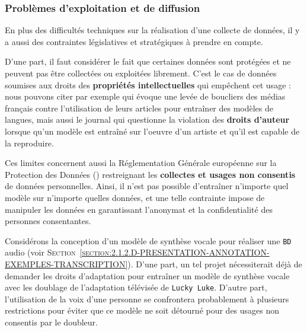 		
		
		\subsubsection{Problèmes d'exploitation et de diffusion}
		\label{section:2.3.1.C-DEFIS-ANNOTATION-ASPECT-DONNEES-DROITS}
		
			En plus des difficultés techniques sur la réalisation d'une collecte de données, il y a aussi des contraintes législatives et stratégiques à prendre en compte.
			
			D'une part, il faut considérer le fait que certaines données sont protégées et ne peuvent pas être collectées ou exploitées librement.
			C'est le cas de données soumises aux droits des \textbf{propriétés intellectuelles} qui empêchent cet usage : nous pouvons citer par exemple \cite{loignon:2023:ia-medias-francais} qui évoque une levée de boucliers des médias français contre l'utilisation de leurs articles pour entraîner des modèles de langues, mais aussi le journal \cite{les-echos:2023:ia-auteur-game} qui questionne la violation des \textbf{droits d'auteur} lorsque qu'un modèle est entraîné sur l'oeuvre d'un artiste et qu'il est capable de la reproduire.
			
			Ces limites concernent aussi la Réglementation Générale européenne sur la Protection des Données (\cite{european-commission:2016:regulation-eu-2016}) restreignant les \textbf{collectes et usages non consentis} de données personnelles.
			Ainsi, il n'est pas possible d'entraîner n'importe quel modèle sur n'importe quelles données, et une telle contrainte impose de manipuler les données en garantissant l'anonymat et la confidentialité des personnes consentantes.
			
			\begin{leftBarExamples}
				Considérons la conception d'un modèle de synthèse vocale pour réaliser une \texttt{BD} audio (voir \textsc{Section~\ref{section:2.1.2.D-PRESENTATION-ANNOTATION-EXEMPLES-TRANSCRIPTION}}).
				D'une part, un tel projet nécessiterait déjà de demander les droits d'adaptation pour entraîner un modèle de synthèse vocale avec les doublage de l'adaptation télévisée de \texttt{Lucky Luke}.
				D'autre part, l'utilisation de la voix d'une personne se confrontera probablement à plusieurs restrictions pour éviter que ce modèle ne soit détourné pour des usages non consentis par le doubleur.
			\end{leftBarExamples}
			
